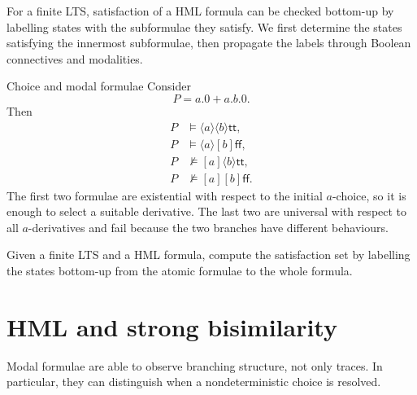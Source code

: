 \documentclass[a4paper]{article}
\newcommand{\ttt}{\mathsf{tt}}
\newcommand{\fff}{\mathsf{ff}}
\begin{document}
For a finite LTS, satisfaction of a HML formula can be checked bottom-up by labelling states with the subformulae they satisfy.
We first determine the states satisfying the innermost subformulae, then propagate the labels through Boolean connectives and modalities.

\begin{snippetexample}{Choice and modal formulae}
    Consider
    \[
        P = a.0+a.b.0.
    \]
    Then
    \begin{align*}
        P &\models \langle a\rangle\langle b\rangle\ttt,\\
        P &\models \langle a\rangle[b]\fff,\\
        P &\not\models [a]\langle b\rangle\ttt,\\
        P &\not\models [a][b]\fff.
    \end{align*}
    The first two formulae are existential with respect to the initial \(a\)-choice, so it is enough to select a suitable derivative.
    The last two are universal with respect to all \(a\)-derivatives and fail because the two branches have different behaviours.
\end{snippetexample}

\begin{snippetexercise}{}
    Given a finite LTS and a HML formula, compute the satisfaction set by labelling the states bottom-up from the atomic formulae to the whole formula.
\end{snippetexercise}

\section{HML and strong bisimilarity}

Modal formulae are able to observe branching structure, not only traces.
In particular, they can distinguish when a nondeterministic choice is resolved.
\end{document}
